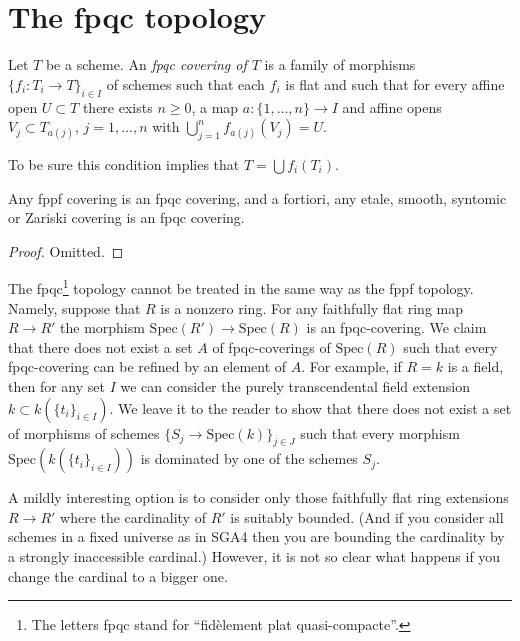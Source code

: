 \section{The fpqc topology}
\label{section-fpqc}

\begin{definition}
\label{definition-fpqc-covering}
Let $T$ be a scheme. An {\it fpqc
covering of $T$} is a family
of morphisms $\{f_i : T_i \to T\}_{i \in I}$ of schemes
such that each $f_i$ is flat and such that for every affine open
$U \subset T$ there exists $n \geq 0$, a map
$a : \{1, \ldots, n\} \to I$ and affine opens
$V_j \subset T_{a(j)}$, $j = 1, \ldots, n$
with $\bigcup_{j = 1}^n f_{a(j)}(V_j) = U$.
\end{definition}

\noindent
To be sure this condition implies that $T = \bigcup f_i(T_i)$.

\begin{lemma}
\label{lemma-zariski-etale-fppf-fpqc}
Any fppf covering is an fpqc covering, and a fortiori,
any etale, smooth, syntomic or Zariski covering is an fpqc covering.
\end{lemma}

\begin{proof}
Omitted.
\end{proof}

\noindent
The fpqc\footnote{The letters fpqc stand for
``fid\`element plat quasi-compacte''.}
topology cannot be treated in the same way as the fppf topology.
Namely, suppose that $R$ is a nonzero ring. For any faithfully flat
ring map $R \to R'$ the morphism $\text{Spec}(R') \to \text{Spec}(R)$
is an fpqc-covering. We claim that there does not exist a set $A$ of
fpqc-coverings of $\text{Spec}(R)$ such that every fpqc-covering can
be refined by an element of $A$. For example, if $R = k$ is a field,
then for any set $I$ we can consider the purely transcendental field extension
$k \subset k(\{t_i\}_{i \in I})$. We leave it to the reader to show
that there does not exist a set of morphisms of schemes
$\{S_j \to \text{Spec}(k)\}_{j \in J}$ such that every morphism
$\text{Spec}(k(\{t_i\}_{i \in I}))$ is dominated by one of
the schemes $S_j$.

\medskip\noindent
A mildly interesting option is to consider only those faithfully flat ring
extensions $R \to R'$ where the cardinality of $R'$ is suitably bounded.
(And if you consider all schemes in a fixed universe as in SGA4 then you
are bounding the cardinality by a strongly inaccessible cardinal.)
However, it is not so clear what happens if you change the cardinal
to a bigger one.

